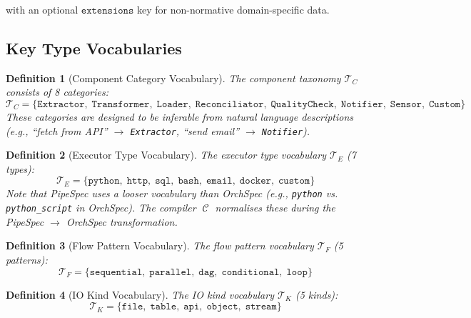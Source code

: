 \documentclass[11pt,a4paper]{article}
\newtheorem{definition}{Definition}[section]
\theoremstyle{definition}
\DeclareMathOperator{\Compile}{\mathcal{C}}
\begin{document}
with an optional $\texttt{extensions}$ key for non-normative domain-specific data.

\subsection{Key Type Vocabularies}

\begin{definition}[Component Category Vocabulary]
The component taxonomy $\mathcal{T}_C$ consists of 8 categories:
\begin{equation}
\mathcal{T}_C = \{\texttt{Extractor},\; \texttt{Transformer},\; \texttt{Loader},\; \texttt{Reconciliator},\; \texttt{QualityCheck},\; \texttt{Notifier},\; \texttt{Sensor},\; \texttt{Custom}\}
\end{equation}
These categories are designed to be inferable from natural language descriptions (e.g., ``fetch from API'' $\to$ \texttt{Extractor}, ``send email'' $\to$ \texttt{Notifier}).
\end{definition}

\begin{definition}[Executor Type Vocabulary]
The executor type vocabulary $\mathcal{T}_E$ (7 types):
\begin{equation}
\mathcal{T}_E = \{\texttt{python},\; \texttt{http},\; \texttt{sql},\; \texttt{bash},\; \texttt{email},\; \texttt{docker},\; \texttt{custom}\}
\end{equation}
Note that PipeSpec uses a looser vocabulary than OrchSpec (e.g., \texttt{python} vs. \texttt{python\_script} in OrchSpec). The compiler $\Compile$ normalises these during the PipeSpec $\to$ OrchSpec transformation.
\end{definition}

\begin{definition}[Flow Pattern Vocabulary]
The flow pattern vocabulary $\mathcal{T}_F$ (5 patterns):
\begin{equation}
\mathcal{T}_F = \{\texttt{sequential},\; \texttt{parallel},\; \texttt{dag},\; \texttt{conditional},\; \texttt{loop}\}
\end{equation}
\end{definition}

\begin{definition}[IO Kind Vocabulary]
The IO kind vocabulary $\mathcal{T}_K$ (5 kinds):
\begin{equation}
\mathcal{T}_K = \{\texttt{file},\; \texttt{table},\; \texttt{api},\; \texttt{object},\; \texttt{stream}\}
\end{equation}
\end{definition}
\end{document}
